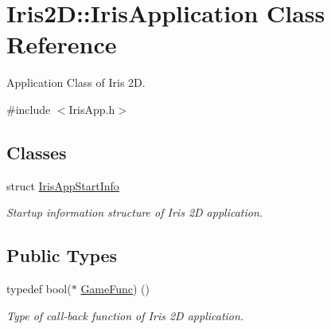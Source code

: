 \hypertarget{class_iris2_d_1_1_iris_application}{}\section{Iris2D\+:\+:Iris\+Application Class Reference}
\label{class_iris2_d_1_1_iris_application}


Application Class of Iris 2D.  




{\ttfamily \#include $<$Iris\+App.\+h$>$}

\subsection*{Classes}
\begin{DoxyCompactItemize}
\item 
struct \hyperlink{struct_iris2_d_1_1_iris_application_1_1_iris_app_start_info}{Iris\+App\+Start\+Info}
\begin{DoxyCompactList}\small\item\em Startup information structure of Iris 2D application. \end{DoxyCompactList}\end{DoxyCompactItemize}
\subsection*{Public Types}
\begin{DoxyCompactItemize}
\item 
\mbox{\label{class_iris2_d_1_1_iris_application_ac74720e6cd3a1968f73e92ea99675884}} 
typedef bool($\ast$ \hyperlink{class_iris2_d_1_1_iris_application_ac74720e6cd3a1968f73e92ea99675884}{Game\+Func}) ()
\begin{DoxyCompactList}\small\item\em Type of call-\/back function of Iris 2D application. \end{DoxyCompactList}\end{DoxyCompactItemize}
